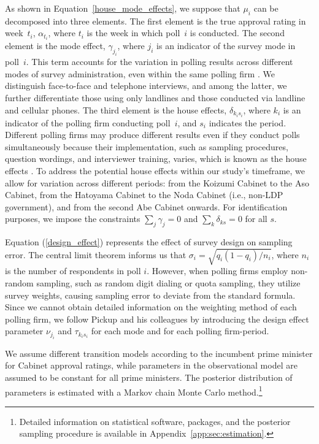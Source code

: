 \documentclass[letterpaper,12pt]{scrartcl}
\begin{document}
As shown in Equation~\eqref{house_mode_effects}, we suppose that $\mu _{i}$ can be decomposed into three elements. The first element is the true approval rating in week~$t_{i}$, $\alpha _{t_{i}}$, where $t_{i}$ is the week in which poll~$i$ is conducted. The second element is the mode effect, $\gamma _{j_{i}}$, where $j_{i}$ is an indicator of the survey mode in poll~$i$. This term accounts for the variation in polling results across different modes of survey administration, even within the same polling firm \citep{Bowling2005JPublHealth}. We distinguish face-to-face and telephone interviews, and among the latter, we further differentiate those using only landlines and those conducted via landline and cellular phones. The third element is the house effects, $\delta _{k_{i}s_{i}}$, where $k_{i}$ is an indicator of the polling firm conducting poll~$i$, and $s_{i}$ indicates the period. Different polling firms may produce different results even if they conduct polls simultaneously because their implementation, such as sampling procedures, question wordings, and interviewer training, varies, which is known as the house effects \citep{Smith1978POQ}. To address the potential house effects within our study's timeframe, we allow for variation across different periods: from the Koizumi Cabinet to the Aso Cabinet, from the Hatoyama Cabinet to the Noda Cabinet (i.e., non-LDP government), and from the second Abe Cabinet onwards. For identification purposes, we impose the constraints $\sum _{j}\gamma _{j}=0$ and $\sum _{k}\delta _{ks}=0$ for all $s$.

Equation (\ref{design_effect}) represents the effect of survey design on sampling error. The central limit theorem informs us that $\sigma _{i}=\sqrt{q_{i}(1-q_{i})/n_{i}}$, where $n_{i}$ is the number of respondents in poll $i$. However, when polling firms employ non-random sampling, such as random digit dialing or quota sampling, they utilize survey weights, causing sampling error to deviate from the standard formula. Since we cannot obtain detailed information on the weighting method of each polling firm, we follow Pickup and his colleagues \citep{Fisher2011ElectStud,Pickup2008IntJForecast,Pickup2011JEPOP} by introducing the design effect parameter $\nu _{j_{i}}$ and $\tau _{k_{i}s_{i}}$ for each mode and for each polling firm-period.

We assume different transition models according to the incumbent prime minister for Cabinet approval ratings, while parameters in the observational model are assumed to be constant for all prime ministers. The posterior distribution of parameters is estimated with a Markov chain Monte Carlo method.\footnote{Detailed information on statistical software, packages, and the posterior sampling procedure is available in Appendix~\ref{app:sec:estimation}.}
\end{document}
